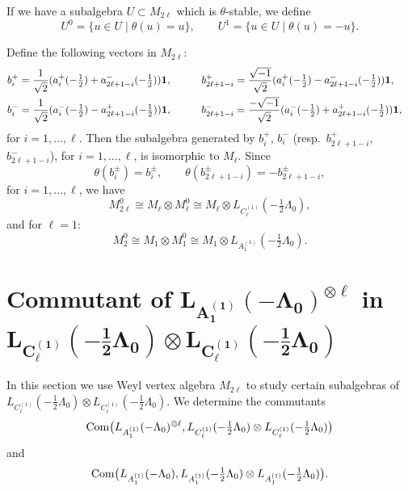 \documentclass[11pt]{article}
\newcommand{\1}{\bf 1}
\begin{document}
If we have a subalgebra $U \subset M_{2 \ell}$ which is
$\theta$-stable, we def\/ine
\[
U ^0 = \{ u \in U \; \vert \; \theta (u) = u \}, \qquad U ^1 = \{ u
\in U \; \vert \; \theta (u) = -u \}.
\]

Def\/ine the following vectors in $M_{2 \ell}$:
\begin{alignat*}{3}
&b_{i} ^+ = \frac{1}{\sqrt{2}}( a_{i} ^+ (-\tfrac{1}{2}) +
a_{2\ell+1-i} ^- (-\tfrac{1}{2}) ) {\1},\qquad
&& b_{2\ell+1-i} ^+ = \frac{\sqrt{-1}}{\sqrt{2}}( a_{i} ^+ (-\tfrac{1}{2}) - a_{2\ell+1-i} ^- (-\tfrac{1}{2}) ) {\1}, &  \\
& b_{i} ^- = \frac{1}{\sqrt{2}}( a_{i} ^- (-\tfrac{1}{2}) -
a_{2\ell+1-i}^+ (-\tfrac{1}{2}) ) {\1}, \qquad &&b_{2\ell+1-i} ^- =
\frac{-\sqrt{-1}}{\sqrt{2}}( a_{i} ^- (-\tfrac{1}{2}) +
a_{2\ell+1-i} ^+ (-\tfrac{1}{2}) ) {\1}, &
\end{alignat*} for $i =1, \dots, \ell$. Then the subalgebra generated by $b_i
^+$, $b _i ^-$ (resp.\ $b_{2\ell+1-i} ^+$, $b _{2\ell+1-i} ^-$), for $i
=1, \dots, \ell$, is isomorphic to $M_{\ell}$.
Since
\[ \theta (b_i ^{\pm}) = b_i ^{\pm}, \qquad  \theta (b_{2\ell+1-i}
^{\pm}) = - b_{2\ell+1-i} ^{\pm},\]
for $i =1, \dots, \ell$, we have \[ M_{2 \ell}^{0} \cong M_{\ell}
\otimes M_{\ell} ^0 \cong M_{\ell} \otimes L_{C_{\ell} ^{(1)}}(
-\tfrac{1}{2}\Lambda _{0}),\] and for $\ell =1$: \[ M_{2}^{0} \cong
M_{1} \otimes M_{1} ^0 \cong M_{1} \otimes L_{A_1 ^{(1)}}(
-\tfrac{1}{2}\Lambda _{0}).\]




\section[Commutant of $L_{A_1 ^{(1)}}(- \Lambda_0) ^{\otimes \ell}$ in  $L_{C_{\ell} ^{(1)}}(-\frac{1}{2}\Lambda_0)
\otimes L_{C_{\ell} ^{(1)}}(-\frac{1}{2}\Lambda_0)$]{Commutant of $\boldsymbol{L_{A_1 ^{(1)}}(- \Lambda_0) ^{\otimes \ell}}$ in  $\boldsymbol{L_{C_{\ell} ^{(1)}}(-\frac{1}{2}\Lambda_0)
\otimes L_{C_{\ell} ^{(1)}}(-\frac{1}{2}\Lambda_0)}$}

In this section we use Weyl vertex algebra $M_{2 \ell}$ to study
certain subalgebras of $L_{C_{\ell} ^{(1)}}(-\tfrac{1}{2}\Lambda_0)
\otimes L_{C_{\ell} ^{(1)}}(-\tfrac{1}{2}\Lambda_0)$. We determine
the commutants
\[
{\rm Com} \big( L_{A_1 ^{(1)}}(- \Lambda_0) ^{\otimes
\ell},L_{C_{\ell} ^{(1)}}(-\tfrac{1}{2}\Lambda_0) \otimes
L_{C_{\ell} ^{(1)}}(-\tfrac{1}{2}\Lambda_0)\big)
\]
and \[
{\rm Com} \big( L_{A_1 ^{(1)}}(-\Lambda_0),L_{A_1
^{(1)}}(-\tfrac{1}{2}\Lambda_0) \otimes L_{A_1
^{(1)}}(-\tfrac{1}{2}\Lambda_0) \big).
\]
\end{document}
